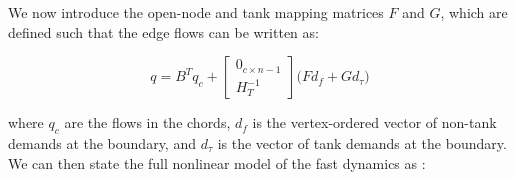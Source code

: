 

We now introduce the open-node and tank mapping matrices ${F}$ and ${G}$, which are defined such that the edge flows can be written as:

\begin{equation}\label{eq:FlowDecomposition}
		q = B^T q_c +	\begin{bmatrix} 0_{c \times n-1} \\ {H}_T^{-1} \end{bmatrix}\Big({F}d_f + {G}d_\tau \Big)
\end{equation}

where $q_c$ are the flows in the chords, $d_f$ is the vertex-ordered vector of non-tank demands at the boundary, and $d_\tau$ is the vector of tank demands at the boundary. We can then state the full nonlinear model of the fast dynamics as \cite{Rathore1030}:




